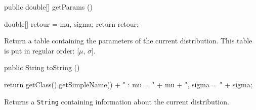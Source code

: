 \begin{code}

   public double[] getParams ()\begin{hide} {
      double[] retour = {mu, sigma};
      return retour;
   }\end{hide}
\end{code}
\begin{tabb}
   Return a table containing the parameters of the current distribution.
   This table is put in regular order: [$\mu$, $\sigma$].
\end{tabb}
\begin{hide}\begin{code}

   public String toString ()\begin{hide} {
      return getClass().getSimpleName() + " : mu = " + mu + ", sigma = " + sigma;
   }\end{hide}
\end{code}
\begin{tabb}
   Returns a \texttt{String} containing information about the current distribution.
\end{tabb}\end{hide}
\begin{code}\begin{hide}
}\end{hide}
\end{code}
